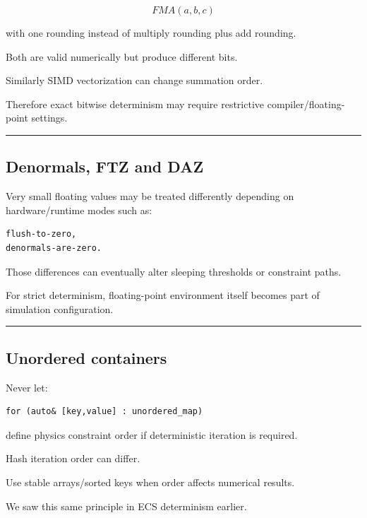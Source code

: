 \[
FMA(a,b,c)
\]

with one rounding instead of multiply rounding plus add rounding.

Both are valid numerically but produce different bits.

Similarly SIMD vectorization can change summation order.

Therefore exact bitwise determinism may require restrictive compiler/floating-point settings.

\begin{center}\rule{0.5\linewidth}{0.5pt}\end{center}

\subsection{Denormals, FTZ and DAZ}\label{06-engine-ii-ch039-denormals-ftz-and-daz}

Very small floating values may be treated differently depending on hardware/runtime modes such as:

\begin{verbatim}
flush-to-zero,
denormals-are-zero.
\end{verbatim}

Those differences can eventually alter sleeping thresholds or constraint paths.

For strict determinism, floating-point environment itself becomes part of simulation configuration.

\begin{center}\rule{0.5\linewidth}{0.5pt}\end{center}

\subsection{Unordered containers}\label{06-engine-ii-ch039-unordered-containers}

Never let:

\begin{verbatim}
for (auto& [key,value] : unordered_map)
\end{verbatim}

define physics constraint order if deterministic iteration is required.

Hash iteration order can differ.

Use stable arrays/sorted keys when order affects numerical results.

We saw this same principle in ECS determinism earlier.

